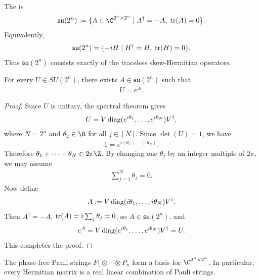 \begin{definition}
\label{def:su-lie-algebra}
The  is
\begin{align}
    \mathfrak{su}(2^n)
    :=
    \{ A \in \C^{2^n \times 2^n}
    \mid
    A^\dagger = -A,\;
    \tr(A)=0
    \}.
\end{align}
Equivalently,
\begin{align}
    \mathfrak{su}(2^n)
    =
    \{ -iH \mid H^\dagger = H,\; \tr(H)=0 \}.
\end{align}
Thus $\mathfrak{su}(2^n)$ consists exactly of the traceless skew-Hermitian operators.
\end{definition}

\begin{fact}
\label{fact:exponential-su}
For every $U \in SU(2^n)$, there exists $A \in \mathfrak{su}(2^n)$ such that
\begin{align}
    U = e^A.
\end{align}
\end{fact}

\begin{proof}
Since $U$ is unitary, the spectral theorem gives
\begin{align}
    U
    =
    V \operatorname{diag}(e^{i\theta_1},\ldots,e^{i\theta_N}) V^\dagger,
\end{align}
where $N=2^n$ and $\theta_j \in \R$ for all $j \in [N]$. Since $\det(U)=1$, we have
\begin{align}
    1
    =
    e^{i(\theta_1+\cdots+\theta_N)}.
\end{align}
Therefore $\theta_1+\cdots+\theta_N \in 2\pi \Z$. By changing one $\theta_j$ by an integer multiple of $2\pi$, we may assume
\begin{align}
    \sum_{j=1}^N \theta_j = 0.
\end{align}
Now define
\begin{align}
    A
    :=
    V \operatorname{diag}(i\theta_1,\ldots,i\theta_N) V^\dagger.
\end{align}
Then $A^\dagger=-A$, $\tr(A)=i\sum_j \theta_j=0$, so $A \in \mathfrak{su}(2^n)$, and
\begin{align}
    e^A
    =
    V \operatorname{diag}(e^{i\theta_1},\ldots,e^{i\theta_N}) V^\dagger
    =
    U.
\end{align}
This completes the proof.
\end{proof}

\begin{fact}
The phase-free Pauli strings
$
    P_1 \otimes \cdots \otimes P_n
$
form a basis for $\C^{2^n \times 2^n}$. In particular, every Hermitian matrix is a real linear combination of Pauli strings.
\end{fact}

